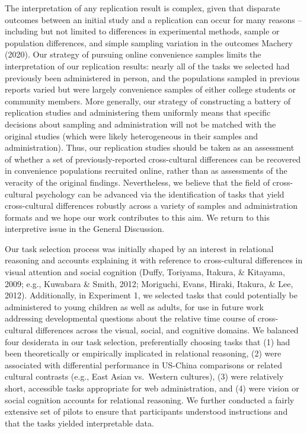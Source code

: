 \documentclass[
  man]{apa6}
\begin{document}
The interpretation of any replication result is complex, given that disparate outcomes between an initial study and a replication can occur for many reasons -- including but not limited to differences in experimental methods, sample or population differences, and simple sampling variation in the outcomes Machery (2020). Our strategy of pursuing online convenience samples limits the interpretation of our replication results: nearly all of the tasks we selected had previously been administered in person, and the populations sampled in previous reports varied but were largely convenience samples of either college students or community members. More generally, our strategy of constructing a battery of replication studies and administering them uniformly means that specific decisions about sampling and administration will not be matched with the original studies (which were likely heterogeneous in their samples and administration). Thus, our replication studies should be taken as an assessment of whether a set of previously-reported cross-cultural differences can be recovered in convenience populations recruited online, rather than as assessments of the veracity of the original findings. Nevertheless, we believe that the field of cross-cultural psychology can be advanced via the identification of tasks that yield cross-cultural differences robustly across a variety of samples and administration formats and we hope our work contributes to this aim. We return to this interpretive issue in the General Discussion.

Our task selection process was initially shaped by an interest in relational reasoning and accounts explaining it with reference to cross-cultural differences in visual attention and social cognition (Duffy, Toriyama, Itakura, \& Kitayama, 2009; e.g., Kuwabara \& Smith, 2012; Moriguchi, Evans, Hiraki, Itakura, \& Lee, 2012). Additionally, in Experiment 1, we selected tasks that could potentially be administered to young children as well as adults, for use in future work addressing developmental questions about the relative time course of cross-cultural differences across the visual, social, and cognitive domains. We balanced four desiderata in our task selection, preferentially choosing tasks that (1) had been theoretically or empirically implicated in relational reasoning, (2) were associated with differential performance in US-China comparisons or related cultural contrasts (e.g., East Asian vs.~Western cultures), (3) were relatively short, accessible tasks appropriate for web administration, and (4) were vision or social cognition accounts for relational reasoning. We further conducted a fairly extensive set of pilots to ensure that participants understood instructions and that the tasks yielded interpretable data.
\end{document}
